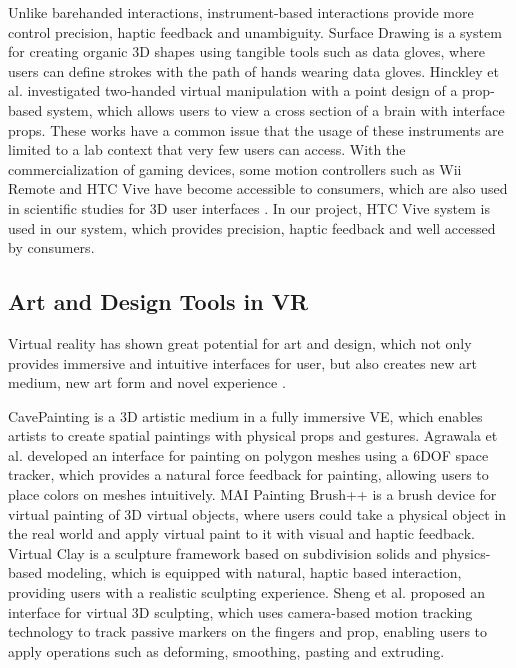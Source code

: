 \documentclass{svjour3}                     %
\begin{document}
Unlike barehanded interactions, instrument-based interactions provide more control precision, haptic feedback and unambiguity.
Surface Drawing \cite{schkolne2001surface} is a system for creating organic 3D shapes using tangible tools such as data gloves, where users can define strokes with the path of hands wearing data gloves.
Hinckley et al. \cite{hinckley1998two} investigated two-handed virtual manipulation with a point design of a prop-based system, which allows users to view a cross section of a brain with interface props.
These works have a common issue that the usage of these instruments are limited to a lab context that very few users can access.
%
With the commercialization of gaming devices, some motion controllers such as Wii Remote and HTC Vive have become accessible to consumers, which are also used in scientific studies for 3D user interfaces \cite{wingcrave2010wii,niehorster2017accuracy}.
%
In our project, HTC Vive system is used in our system, which provides precision, haptic feedback and well accessed by consumers.

\subsection{Art and Design Tools in VR}
\label{sec:art}
Virtual reality has shown great potential for art and design, which not only provides immersive and intuitive interfaces for user, but also creates new art medium, new art form and novel experience \cite{laviola20113d}.

CavePainting \cite{keefe2001cavepainting} is a 3D artistic medium in a fully immersive VE, which enables artists to create spatial paintings with physical props and gestures. Agrawala et al. \cite{agrawala19953d} developed an interface for painting on polygon meshes using a 6DOF space tracker, which provides a natural force feedback for painting, allowing users to place colors on meshes intuitively. MAI Painting Brush++ \cite{otsuki2017brush} is a brush device for virtual painting of 3D virtual objects, where users could take a physical object in the real world and apply virtual paint to it with visual and haptic feedback.
Virtual Clay \cite{mcdonnell2001virtual} is a sculpture framework based on subdivision solids and physics-based modeling, which is equipped with natural, haptic based interaction, providing users with a realistic sculpting experience. Sheng et al. \cite{sheng2006interface} proposed an interface for virtual 3D sculpting, which uses camera-based motion tracking technology to track passive markers on the fingers and prop, enabling users to apply operations such as deforming, smoothing, pasting and extruding.
\end{document}
